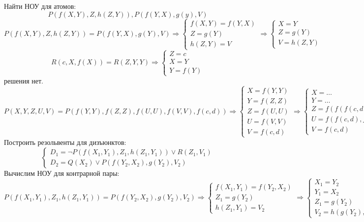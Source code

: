 \documentclass[11pt]{article}
\begin{document}
Найти НОУ для атомов:
\begin{equation*}
P(f(X, Y), Z, h(Z, Y)), P(f(Y, X), g(y), V)
\end{equation*}
\begin{equation*}
P(f(X, Y), Z, h(Z, Y)) = P(f(Y, X), g(Y), V) \Rightarrow
\begin{cases}
f(X, Y) = f(Y, X) \\
Z = g(Y) \\
h(Z, Y) = V
\end{cases}
\Rightarrow
\begin{cases}
X = Y \\
Z = g(Y) \\
V = h(Z, Y)
\end{cases}
\end{equation*}
\begin{equation*}
R(c, X, f(X)) = R(Z, Y, Y)
\Rightarrow
\begin{cases}
Z = c \\
X = Y \\
Y = f(Y)
\end{cases}
\end{equation*}
решения нет.
\begin{equation*}
P(X, Y, Z, U, V) = P(f(Y, Y), f(Z, Z), f(U, U), f(V, V), f(c, d))
\Rightarrow
\begin{cases}
X = f(Y, Y) \\
Y = f(Z, Z) \\
Z = f(U, U) \\
U = f(V, V) \\
V = f(c, d)
\end{cases}
\Rightarrow
\begin{cases}
X = \ldots \\
Y = \ldots \\
Z = f(f(f(c, d), f(c, d)), f(f(c, d), f(c, d))) \\
U = f(f(c, d), f(c, d)) \\
V = f(c, d)
\end{cases}
\end{equation*}
Построить резольвенты для дизъюнктов:
\begin{equation*}
\begin{cases}
D_1 = \lnot P(f(X_1, Y_1), Z_1, h(Z_1, Y_1)) \lor R(Z_1, V_1) \\
D_2 = Q(X_2) \lor P(f(Y_2, X_2), g(Y_2), V_2)
\end{cases}
\end{equation*}
Вычислим НОУ для контрарной пары:
\begin{equation*}
P(f(X_1, Y_1), Z_1, h(Z_1, Y_1)) = P(f(Y_2, X_2), g(Y_2), V_2)
\Rightarrow
\begin{cases}
f(X_1, Y_1) = f(Y_2, X_2) \\
Z_1 = g(Y_2) \\
h(Z_1, Y_1) = V_2
\end{cases}
\Rightarrow
\begin{cases}
X_1 = Y_2 \\
Y_1 = X_2 \\
Z_1 = g(Y_2) \\
V_2 = h(g(Y_2), X_2)
\end{cases}
\end{equation*}
\end{document}
